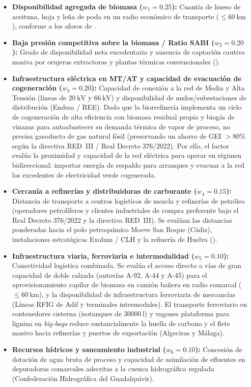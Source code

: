 \documentclass{report}
\begin{document}
\begin{itemize}
    \item \textbf{Disponibilidad agregada de biomasa ($w_1 = \num{0.25}$):} Cuantía de hueso de aceituna, hoja y leña de poda en un radio económico de transporte ($\le \SI{60}{\kilo\metre}$), conforme a los aforos de \textcite{MAPA2025, AICA2026}.
    \item \textbf{Baja presión competitiva sobre la biomasa / Ratio SABI ($w_2 = \num{0.20}$):} Grado de disponibilidad neta excedentaria y ausencia de captación cautiva masiva por orujeras extractoras y plantas térmicas convencionales (\textcite{SABI2026}).
    \item \textbf{Infraestructura eléctrica en MT/AT y capacidad de evacuación de cogeneración ($w_3 = \num{0.20}$):} Capacidad de conexión a la red de Media y Alta Tensión (líneas de $\SI{20}{\kilo\volt}$ y $\SI{66}{\kilo\volt}$) y disponibilidad de nudos/subestaciones de distribución (Endesa / REE). Dado que la biorrefinería implementa un ciclo de cogeneración de alta eficiencia con biomasa residual propia y biogás de vinazas para autoabastecer su demanda térmica de vapor de proceso, no precisa gasoducto de gas natural fósil (preservando un ahorro de GEI $> 80\%$ según la directiva RED~III / Real Decreto 376/2022). Por ello, el factor evalúa la proximidad y capacidad de la red eléctrica para operar en régimen bidireccional: importar energía de respaldo para arranques y evacuar a la red los excedentes de electricidad verde cogenerada.
    \item \textbf{Cercanía a refinerías y distribuidoras de carburante ($w_4 = \num{0.15}$):} Distancia de transporte a centros logísticos de mezcla y refinerías de petróleo (operadores petrolíferos y clientes industriales de compra preferente bajo el Real Decreto 376/2022 y la directiva RED~III). Se evalúan las distancias ponderadas hacia el polo petroquímico Moeve San Roque (Cádiz), instalaciones estratégicas Exolum / CLH y la refinería de Huelva (\textcite{CORES2026}).
    \item \textbf{Infraestructura viaria, ferroviaria e intermodalidad ($w_5 = \num{0.10}$):} Conectividad logística combinada. Se evalúa el acceso directo a vías de gran capacidad de doble calzada (autovías A-92, A-44 y A-45) para el aprovisionamiento capilar de biomasa en camión bañera en radio comarcal ($\le \SI{60}{\kilo\metre}$), y la disponibilidad de infraestructura ferroviaria de mercancías (Líneas RFIG de Adif y terminales intermodales). El transporte ferroviario en contenedores cisterna (isotanques de $\SI{30000}{\litre}$) y vagones plataforma para lignina en \textit{big-bags} reduce sustancialmente la huella de carbono y el flete masivo hacia refinerías y puertos de exportación (Algeciras y Málaga).
    \item \textbf{Recursos hídricos y saneamiento industrial ($w_6 = \num{0.10}$):} Concesión de dotación de agua bruta de proceso y capacidad de asimilación de efluentes en depuradoras comarcales adscritas a la cuenca hidrográfica regulada (Confederación Hidrográfica del Guadalquivir).
\end{itemize}
\end{document}
